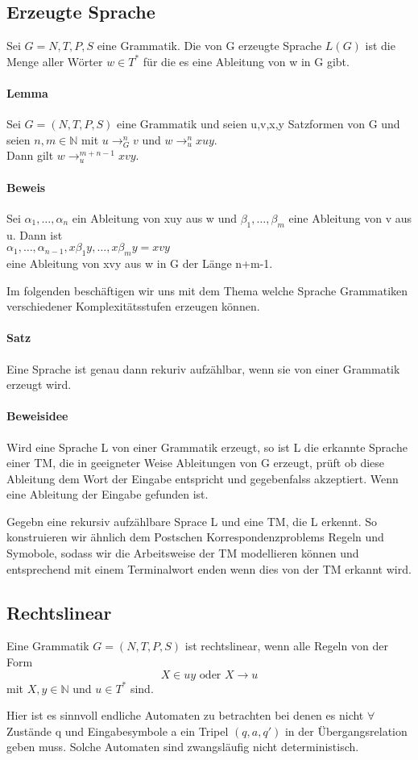 \subsection{Erzeugte Sprache}
    Sei \(G=N,T,P,S\) eine Grammatik. Die von G erzeugte Sprache \(L(G)\) ist die Menge aller Wörter \(w\in T^*\) für die es eine Ableitung von w in G gibt.
\paragraph*{Lemma} 
    Sei \(G=(N,T,P,S)\) eine Grammatik und seien u,v,x,y Satzformen von G und seien \(n,m\in\mathbb{N}\) mit \(u\to_G^nv\) und \(w\to_u^nxuy\).\\
    Dann gilt \(w\to_u^{m+n-1}xvy\).
\paragraph*{Beweis}
    Sei \(\alpha _1,\dots,\alpha_n\) ein Ableitung von xuy aus w und \(\beta_1,\dots,\beta_m\) eine Ableitung von v aus u. Dann ist\\ 
    \(\alpha_1,\dots,\alpha_{n-1},x\beta_1y,\dots,x\beta_my=xvy\)\\
    eine Ableitung von xvy aus w in G der Länge n+m-1.\par\bigskip
    Im folgenden beschäftigen wir uns mit dem Thema welche Sprache Grammatiken verschiedener Komplexitätsstufen erzeugen können.
\paragraph*{Satz}
    Eine Sprache ist genau dann rekuriv aufzählbar, wenn sie von einer Grammatik erzeugt wird.
\paragraph*{Beweisidee} Wird eine Sprache L von einer Grammatik erzeugt, so ist L die erkannte Sprache einer TM, die in geeigneter Weise Ableitungen von G erzeugt, prüft ob diese Ableitung dem Wort der Eingabe entspricht und gegebenfalss akzeptiert. Wenn eine Ableitung der Eingabe gefunden ist.\par\bigskip
Gegebn eine rekursiv aufzählbare Sprace L und eine TM, die L erkennt. So konstruieren wir ähnlich dem Postschen Korrespondenzproblems Regeln und Symobole, sodass wir die Arbeitsweise der TM modellieren können und entsprechend mit einem Terminalwort enden wenn dies von der TM erkannt wird.
\subsection{Rechtslinear}
    Eine Grammatik \(G=(N,T,P,S)\) ist rechtslinear, wenn alle Regeln von der Form 
    \[X\in uy \text{ oder } X\to u\]
    mit \(X,y\in\mathbb{N}\) und \(u\in T^*\) sind.\par\bigskip 
    Hier ist es sinnvoll endliche Automaten zu betrachten bei denen es nicht \(\forall\) Zustände q und Eingabesymbole a ein Tripel \((q,a,q')\) in der Übergangsrelation geben muss. Solche Automaten sind zwangsläufig nicht deterministisch.
